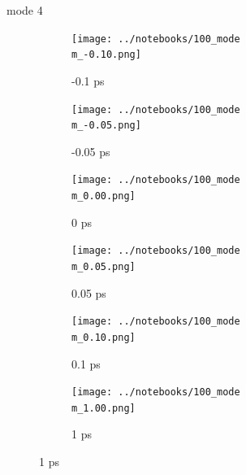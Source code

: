 \documentclass{beamer}
\begin{document}
\renewcommand\m{4}
\begin{frame}{mode \m}
	\begin{figure}
		\centering
		\begin{subfigure}[b]{\w\textwidth}
			\centering
			\texttt{[image: ../notebooks/100\_mode\\m\_-0.10.png]}
			\caption{-0.1 ps}
		\end{subfigure}
		\begin{subfigure}[b]{\w\textwidth}
			\centering
			\texttt{[image: ../notebooks/100\_mode\\m\_-0.05.png]}
			\caption{-0.05 ps}
		\end{subfigure}
		\begin{subfigure}[b]{\w\textwidth}
			\centering
			\texttt{[image: ../notebooks/100\_mode\\m\_0.00.png]}
			\caption{0 ps}
		\end{subfigure}
		\begin{subfigure}[b]{\w\textwidth}
			\centering
			\texttt{[image: ../notebooks/100\_mode\\m\_0.05.png]}
			\caption{0.05 ps}
		\end{subfigure}
		\begin{subfigure}[b]{\w\textwidth}
			\centering
			\texttt{[image: ../notebooks/100\_mode\\m\_0.10.png]}
			\caption{0.1 ps}
		\end{subfigure}
		\begin{subfigure}[b]{\w\textwidth}
			\centering
			\texttt{[image: ../notebooks/100\_mode\\m\_1.00.png]}
			\caption{1 ps}
		\end{subfigure}
	\end{figure}
\end{frame}
\end{document}
